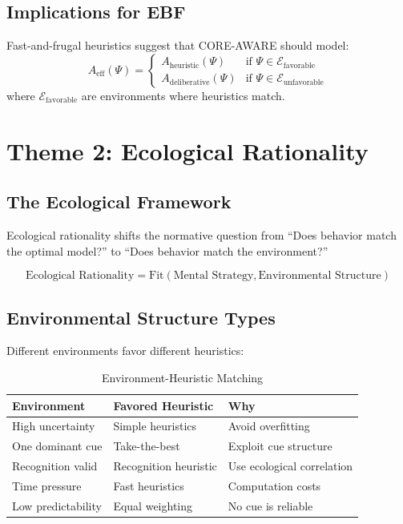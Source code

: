\subsection{Implications for EBF}

Fast-and-frugal heuristics suggest that CORE-AWARE should model:
\begin{equation}
A_{\text{eff}}(\Psi) = \begin{cases}
A_{\text{heuristic}}(\Psi) & \text{if } \Psi \in \mathcal{E}_{\text{favorable}} \\
A_{\text{deliberative}}(\Psi) & \text{if } \Psi \in \mathcal{E}_{\text{unfavorable}}
\end{cases}
\end{equation}
where $\mathcal{E}_{\text{favorable}}$ are environments where heuristics match.


\section{Theme 2: Ecological Rationality}
\label{sec:gi-ecological}

\subsection{The Ecological Framework}

Ecological rationality \citep{gigerenzer2001bounded} shifts the normative question from ``Does behavior match the optimal model?'' to ``Does behavior match the environment?''

\begin{equation}
\text{Ecological Rationality} = \text{Fit}(\text{Mental Strategy}, \text{Environmental Structure})
\end{equation}

\subsection{Environmental Structure Types}

Different environments favor different heuristics:

\begin{table}[htbp]
\centering
\caption{Environment-Heuristic Matching}
\label{tab:gi-environments}
\renewcommand{\arraystretch}{1.3}
\begin{tabular}{@{}lll@{}}
\toprule
\textbf{Environment} & \textbf{Favored Heuristic} & \textbf{Why} \\
\midrule
High uncertainty & Simple heuristics & Avoid overfitting \\
One dominant cue & Take-the-best & Exploit cue structure \\
Recognition valid & Recognition heuristic & Use ecological correlation \\
Time pressure & Fast heuristics & Computation costs \\
Low predictability & Equal weighting & No cue is reliable \\
\bottomrule
\end{tabular}
\end{table}

